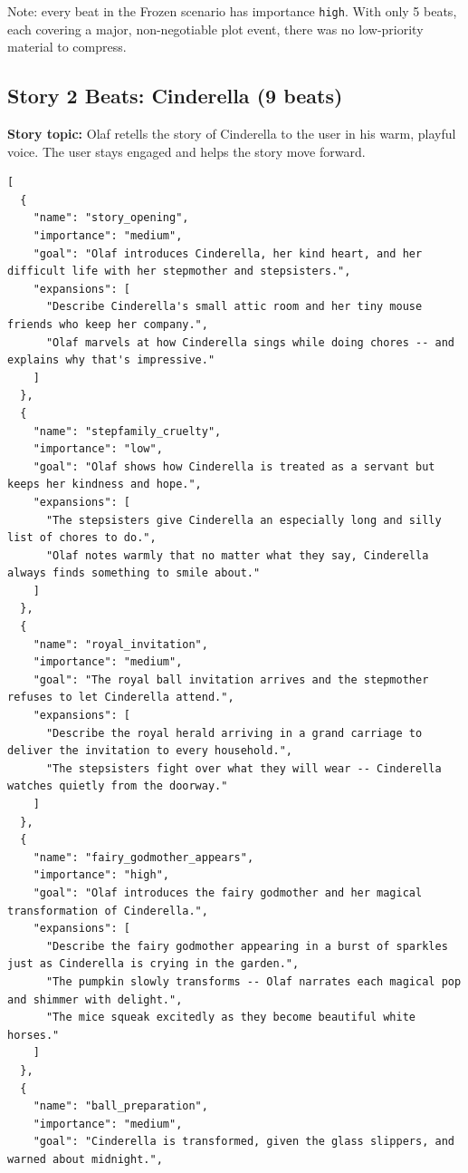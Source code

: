 Note: every beat in the Frozen scenario has importance \texttt{high}. With
only 5 beats, each covering a major, non-negotiable plot event, there was no
low-priority material to compress.

\subsection{Story 2 Beats: Cinderella (9 beats)}
\label{app:beats-cinderella}

\textbf{Story topic:} Olaf retells the story of Cinderella to the user in
his warm, playful voice. The user stays engaged and helps the story move
forward.

\begin{lstlisting}
[
  {
    "name": "story_opening",
    "importance": "medium",
    "goal": "Olaf introduces Cinderella, her kind heart, and her difficult life with her stepmother and stepsisters.",
    "expansions": [
      "Describe Cinderella's small attic room and her tiny mouse friends who keep her company.",
      "Olaf marvels at how Cinderella sings while doing chores -- and explains why that's impressive."
    ]
  },
  {
    "name": "stepfamily_cruelty",
    "importance": "low",
    "goal": "Olaf shows how Cinderella is treated as a servant but keeps her kindness and hope.",
    "expansions": [
      "The stepsisters give Cinderella an especially long and silly list of chores to do.",
      "Olaf notes warmly that no matter what they say, Cinderella always finds something to smile about."
    ]
  },
  {
    "name": "royal_invitation",
    "importance": "medium",
    "goal": "The royal ball invitation arrives and the stepmother refuses to let Cinderella attend.",
    "expansions": [
      "Describe the royal herald arriving in a grand carriage to deliver the invitation to every household.",
      "The stepsisters fight over what they will wear -- Cinderella watches quietly from the doorway."
    ]
  },
  {
    "name": "fairy_godmother_appears",
    "importance": "high",
    "goal": "Olaf introduces the fairy godmother and her magical transformation of Cinderella.",
    "expansions": [
      "Describe the fairy godmother appearing in a burst of sparkles just as Cinderella is crying in the garden.",
      "The pumpkin slowly transforms -- Olaf narrates each magical pop and shimmer with delight.",
      "The mice squeak excitedly as they become beautiful white horses."
    ]
  },
  {
    "name": "ball_preparation",
    "importance": "medium",
    "goal": "Cinderella is transformed, given the glass slippers, and warned about midnight.",

\end{lstlisting}
